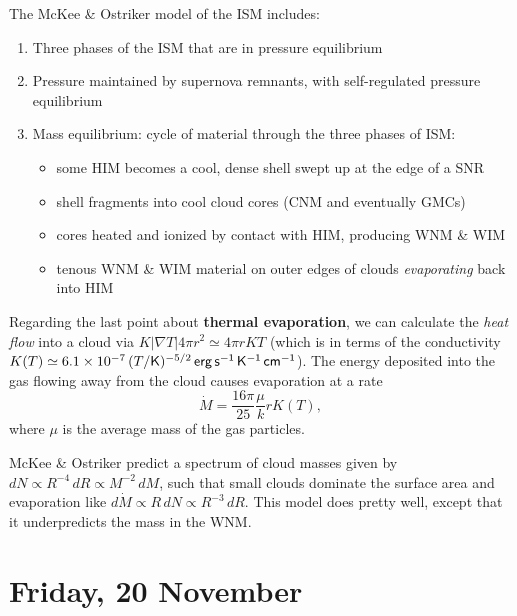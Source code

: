 \documentclass{tufte-handout}
\renewcommand{\textbf}[1]{{\bf \textcolor{dark-gray}{#1}}}
\renewcommand{\rm}{\sf}
\renewcommand{\textrm}{\textsf}
\newcommand{\e}[1]{\times 10^{#1}}
\begin{document}
The McKee \& Ostriker model of the ISM includes:
\begin{enumerate}
\item Three phases of the ISM that are in pressure equilibrium
\item Pressure maintained by supernova remnants, with self-regulated pressure equilibrium
\item Mass equilibrium: cycle of material through the three phases of ISM:
\begin{itemize}
\item some HIM becomes a cool, dense shell swept up at the edge of a SNR
\item shell fragments into cool cloud cores (CNM and eventually GMCs)
\item cores heated and ionized by contact with HIM, producing WNM \& WIM
\item tenous WNM \& WIM material on outer edges of clouds \textit{evaporating} back into HIM
\end{itemize}
\end{enumerate}

Regarding the last point about \textbf{thermal evaporation}, we can calculate the \textit{heat flow} into a cloud via  $K |\nabla T|4\pi r^2 \simeq 4\pi r KT$ (which is in terms of the conductivity $K(T) \simeq 6.1\e{-7}\, (T/\textrm{K})^{-5/2} \, {\rm erg \, s^{-1}\, K^{-1}\, cm^{-1}}$). The energy deposited into the gas flowing away from the cloud causes evaporation at a rate
\begin{equation}
\dot M = \frac{16\pi}{25} \frac{\mu}{k}rK(T),
\end{equation}
where $\mu$ is the average mass of the gas particles.

McKee \& Ostriker predict a spectrum of cloud masses given by $dN \propto R^{-4}\,dR \propto M^{-2}\,dM$, such that small clouds dominate the surface area and evaporation like $d\dot M \propto R\,dN \propto R^{-3}\, dR$. This model does pretty well, except that it underpredicts the mass in the WNM.


\section{Friday, 20 November}
\end{document}
